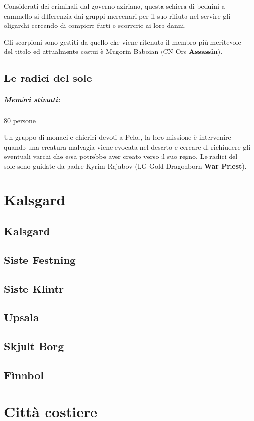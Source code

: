 \documentclass[letterpaper,twocolumn,openany,nodeprecatedcode]{dndbook}
\begin{document}
Considerati dei criminali dal governo aziriano, questa schiera di beduini a cammello si differenzia dai gruppi mercenari per il suo rifiuto nel servire gli oligarchi cercando di compiere furti o scorrerie ai loro danni.

Gli scorpioni sono gestiti da quello che viene ritenuto il membro più meritevole del titolo ed attualmente costui è Mugorin Baboian (CN Orc \textbf{Assassin}).

\section{Le radici del sole}
\paragraph{Membri stimati:} 80 persone

Un gruppo di monaci e chierici devoti a Pelor, la loro missione è intervenire quando una creatura malvagia viene evocata nel deserto e cercare di richiudere gli eventuali varchi che essa potrebbe aver creato verso il suo regno.
Le radici del sole sono guidate da padre Kyrim Rajabov (LG Gold Dragonborn \textbf{War Priest}).

\chapter{Kalsgard}
\section{Kalsgard}
\section{Siste Festning}
\section{Siste Klintr}
\section{Upsala}
\section{Skjult Borg}
\section{Fìnnbol}

\chapter{Città costiere}
\end{document}
